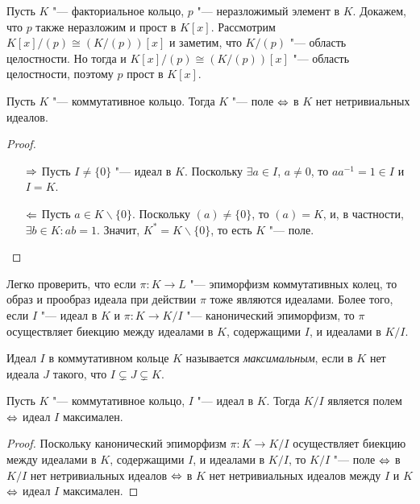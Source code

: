 \begin{example}
	Пусть $K$ "--- факториальное кольцо, $p$ "--- неразложимый элемент в $K$. Докажем, что $p$ также неразложим и прост в $K[x]$. Рассмотрим $K[x] / (p) \cong (K / (p))[x]$ и заметим, что $K / (p)$ "--- область целостности. Но тогда и $K[x] / (p) \cong (K / (p))[x]$ "--- область целостности, поэтому $p$ прост в $K[x]$.
\end{example}

\begin{proposition}
	Пусть $K$ "--- коммутативное кольцо. Тогда $K$ "--- поле $\Leftrightarrow$ в $K$ нет нетривиальных идеалов.
\end{proposition}

\begin{proof}~
	\begin{itemize}
		\item[$\Rightarrow$] Пусть $I \ne \{0\}$ "--- идеал в $K$. Поскольку $\exists a \in I$, $a \ne 0$, то $aa^{-1} = 1 \in I$ и $I = K$.
		\item[$\Leftarrow$] Пусть $a \in K \backslash \{0\}$. Поскольку $(a) \ne \{0\}$, то $(a) = K$, и, в частности, $\exists b \in K: ab = 1$. Значит, $K^* = K \backslash \{0\}$, то есть $K$ "--- поле.\qedhere
	\end{itemize}
\end{proof}

\begin{note}
	Легко проверить, что если $\pi: K \to L$ "--- эпиморфизм коммутативных колец, то образ и прообраз идеала при действии $\pi$ тоже являются идеалами. Более того, если $I$ "--- идеал в $K$ и $\pi: K \to K / I$ "--- канонический эпиморфизм, то $\pi$ осуществляет биекцию между идеалами в $K$, содержащими $I$, и идеалами в $K / I$.
\end{note}

\begin{definition}
	Идеал $I$ в коммутативном кольце $K$ называется \textit{максимальным}, если в $K$ нет идеала $J$ такого, что $I \subsetneq J \subsetneq K$.
\end{definition}

\begin{proposition}
	Пусть $K$ "--- коммутативное кольцо, $I$ "--- идеал в $K$. Тогда $K / I$ является полем $\Leftrightarrow$ идеал $I$ максимален.
\end{proposition}

\begin{proof}
	Поскольку канонический эпиморфизм $\pi: K \to K/I$ осуществляет биекцию между идеалами в $K$, содержащими $I$, и идеалами в $K / I$, то $K / I$ "--- поле $\Leftrightarrow$ в $K / I$ нет нетривиальных идеалов $\Leftrightarrow$ в $K$ нет нетривиальных идеалов между $I$ и $K$ $\Leftrightarrow$ идеал $I$ максимален.
\end{proof}

